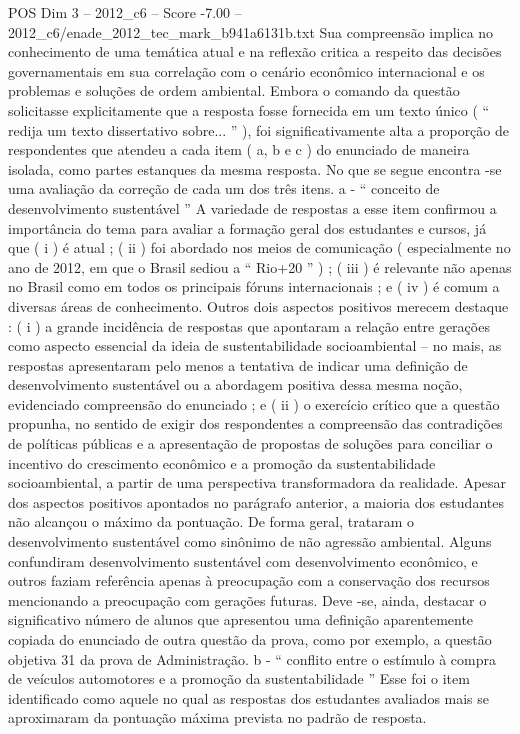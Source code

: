\begin{textsample}{POS Dim 3 – 2012\_c6 – Score -7.00 – 2012\_c6/enade\_2012\_tec\_mark\_b941a6131b.txt}
Sua compreensão implica no conhecimento de uma temática atual e na reflexão critica a respeito das decisões governamentais em sua correlação com o cenário econômico internacional e os problemas e soluções de ordem ambiental.
Embora o comando da questão solicitasse explicitamente que a resposta fosse fornecida em um texto único ( “ redija um texto dissertativo sobre... ” ), foi significativamente alta a proporção de respondentes que atendeu a cada item ( a, b e c ) do enunciado de maneira isolada, como partes estanques da mesma resposta.
No que se segue encontra -se uma avaliação da correção de cada um dos três itens. a - “ conceito de desenvolvimento sustentável ” A variedade de respostas a esse item confirmou a importância do tema para avaliar a formação geral dos estudantes e cursos, já que ( i ) é atual ; ( ii ) foi abordado nos meios de comunicação ( especialmente no ano de 2012, em que o Brasil sediou a “ Rio+20 ” ) ; ( iii ) é relevante não apenas no Brasil como em todos os principais fóruns internacionais ; e ( iv ) é comum a diversas áreas de conhecimento.
Outros dois aspectos positivos merecem destaque : ( i ) a grande incidência de respostas que apontaram a relação entre gerações como aspecto essencial da ideia de sustentabilidade socioambiental – no mais, as respostas apresentaram pelo menos a tentativa de indicar uma definição de desenvolvimento sustentável ou a abordagem positiva dessa mesma noção, evidenciado compreensão do enunciado ; e ( ii ) o exercício crítico que a questão propunha, no sentido de exigir dos respondentes a compreensão das contradições de políticas públicas e a apresentação de propostas de soluções para conciliar o incentivo do crescimento econômico e a promoção da sustentabilidade socioambiental, a partir de uma perspectiva transformadora da realidade.
Apesar dos aspectos positivos apontados no parágrafo anterior, a maioria dos estudantes não alcançou o máximo da pontuação.
De forma geral, trataram o desenvolvimento sustentável como sinônimo de não agressão ambiental.
Alguns confundiram desenvolvimento sustentável com desenvolvimento econômico, e outros faziam referência apenas à preocupação com a conservação dos recursos mencionando a preocupação com gerações futuras.
Deve -se, ainda, destacar o significativo número de alunos que apresentou uma definição aparentemente copiada do enunciado de outra questão da prova, como por exemplo, a questão objetiva 31 da prova de Administração. b - “ conflito entre o estímulo à compra de veículos automotores e a promoção da sustentabilidade ” Esse foi o item identificado como aquele no qual as respostas dos estudantes avaliados mais se aproximaram da pontuação máxima prevista no padrão de resposta.

\end{textsample}
